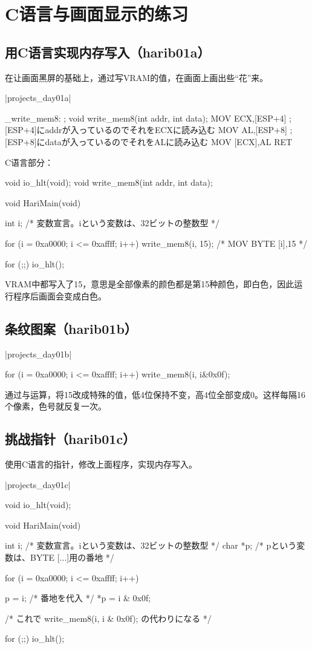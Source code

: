 ﻿\chapter{	C语言与画面显示的练习	}
\section{	用C语言实现内存写入（harib01a）	}
在让画面黑屏的基础上，通过写VRAM的值，在画面上画出些“花”来。

\dag|projects_day\harib01a|
\begin{code}[label=naskfunc.nas]
_write_mem8:	; void write_mem8(int addr, int data);
		MOV		ECX,[ESP+4]		; [ESP+4]にaddrが入っているのでそれをECXに読み込む
		MOV		AL,[ESP+8]		; [ESP+8]にdataが入っているのでそれをALに読み込む
		MOV		[ECX],AL
		RET
\end{code}

C语言部分：
\begin{code}[label=bootpack.c]
void io_hlt(void);
void write_mem8(int addr, int data);

void HariMain(void)
{
	int i; /* 変数宣言。iという変数は、32ビットの整数型 */

	for (i = 0xa0000; i <= 0xaffff; i++) {
		write_mem8(i, 15); /* MOV BYTE [i],15 */
	}

	for (;;) {
		io_hlt();
	}
}
\end{code}

VRAM中都写入了15，意思是全部像素的颜色都是第15种颜色，即白色，因此运行程序后画面会变成白色。
\section{	条纹图案（harib01b）	}
\dag|projects_day\harib01b|
\begin{code}[label=bootpack.c]

	for (i = 0xa0000; i <= 0xaffff; i++) {
		write_mem8(i, i&0x0f);
	}
\end{code}

通过与运算，将15改成特殊的值，低4位保持不变，高4位全部变成0。这样每隔16个像素，色号就反复一次。


\section{	挑战指针（harib01c）	}
使用C语言的指针，修改上面程序，实现内存写入。

\dag|projects_day\harib01c|
\begin{code}[label=bootpack.c]
void io_hlt(void);

void HariMain(void)
{
	int i; /* 変数宣言。iという変数は、32ビットの整数型 */
	char *p; /* pという変数は、BYTE [...]用の番地 */

	for (i = 0xa0000; i <= 0xaffff; i++) {

		p = i; /* 番地を代入 */
		*p = i & 0x0f;

		/* これで write_mem8(i, i & 0x0f); の代わりになる */
	}

	for (;;) {
		io_hlt();
	}
}
\end{code}
